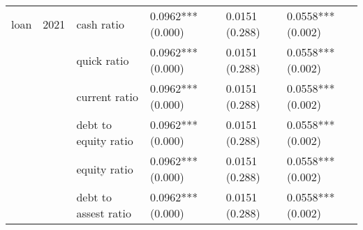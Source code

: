 \begin{tabular}{llllll}
loan & 2021 & cash ratio &  0.0962*** (0.000) &  0.0151 (0.288) &  0.0558*** (0.002) \\
     &      & quick ratio &  0.0962*** (0.000) &  0.0151 (0.288) &  0.0558*** (0.002) \\
     &      & current ratio &  0.0962*** (0.000) &  0.0151 (0.288) &  0.0558*** (0.002) \\
     &      & debt to equity ratio &  0.0962*** (0.000) &  0.0151 (0.288) &  0.0558*** (0.002) \\
     &      & equity ratio &  0.0962*** (0.000) &  0.0151 (0.288) &  0.0558*** (0.002) \\
     &      & debt to assest ratio &  0.0962*** (0.000) &  0.0151 (0.288) &  0.0558*** (0.002) \\
\bottomrule
\end{tabular}
